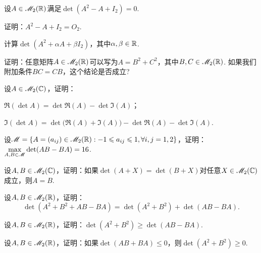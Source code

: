 \begin{problem}
  设$A\in\mathscr M_2(\mathbb R)$满足$\det(A^2-A+I_2)=0$.
  \begin{enum}
    \item\label{prob2.22a} 证明：$A^2-A+I_2=O_2$.
    \item 计算$\det(A^2+\alpha A+\beta I_2)$，其中$\alpha,\beta\in\mathbb R$.
  \end{enum}
\end{problem}

\begin{problem}
  证明：任意矩阵$A\in\mathscr M_2(\mathbb R)$可以写为$A=B^2+C^2$，其中$B,C\in\mathscr M_2(\mathbb R)$. 如果我们附加条件$BC=CB$，这个结论是否成立?
\end{problem}

\begin{mybox}
  \begin{problem}
    设$A\in\mathscr M_2(\mathbb C)$，证明：
    \begin{enum}
      \item $\Re(\det A)=\det\Re(A)-\det\Im(A)$；
      \item $\Im(\det A)=\det\big(\Re(A)+\Im(A)\big)
          -\det\Re(A)-\det\Im(A)$.
    \end{enum}
  \end{problem}
\end{mybox}

\begin{mybox}
  \begin{problem}[一个极值问题.]

    设$\mathscr M=\{A=(a_{ij})\in\mathscr M_2(\mathbb R):-1\leqslant a_{ij}\leqslant1,\forall i,j=1,2\}$，证明：$\max_{A,B\in\MM}\det(AB-BA)=16$.
  \end{problem}
\end{mybox}

\begin{problem}
  设$A,B\in\mathscr M_2(\mathbb C)$，证明：如果$\det(A+X)=\det(B+X)$对任意$X\in\mathscr M_2(\mathbb C)$成立，则$A=B$.
\end{problem}

\begin{problem}
  设$A,B\in\mathscr M_2(\mathbb R)$，证明：
  \[
    \det(A^2 + B^2 + AB - BA) = \det(A^2 + B^2) + \det(AB - BA).
  \]
\end{problem}

\begin{problem}
  设$A,B\in\mathscr M_2(\mathbb R)$，证明：$\det(A^2 + B^2)\ge \det(AB - BA)$.
\end{problem}

\begin{problem}
  设$A,B\in\mathscr M_2(\mathbb R)$，证明：如果$\det(AB+BA)\le0$，则$\det(A^2+B^2)\ge0$.
\end{problem}

